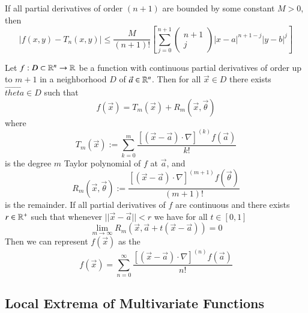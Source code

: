 \documentclass[12pt, a4paper, oneside, openright, titlepage]{book}
\begin{document}
\begin{appendices}
    \begin{rmk}
        If all partial derivatives of order $(n+1)$ are bounded by some constant $M > 0$, then \begin{equation}
            |f(x,y) - T_n(x,y)| \leq \frac{M}{(n+1)!}\left[\sum\limits_{j=0}^{n+1}\begin{pmatrix} n + 1 \\ j \end{pmatrix}|x-a|^{n+1-j}|y-b|^j\right]
        \end{equation}
    \end{rmk}
    
    
    \begin{namthm}
        Let $f:D\subset\mathbb R^n \rightarrow \mathbb R$ be a function with continuous partial derivatives of order up to $m+1$ in a neighborhood $D$ of $\vec{a} \in \mathbb R^n$. Then for all $\vec{x} \in D$ there exists $\vec{theta} \in D$ such that \begin{equation}
            f(\vec{x}) = T_m(\vec{x}) + R_m(\vec{x},\vec{\theta})
        \end{equation}
        where \begin{equation}
            T_m(\vec{x}) := \sum\limits_{k=0}^m\frac{\left[(\vec{x} - \vec{a})\cdot \nabla\right]^{(k)}f(\vec{a})}{k!}
        \end{equation}
        is the degree $m$ Taylor polynomial of $f$ at $\vec{a}$, and \begin{equation}
            R_m(\vec{x}, \vec{\theta}) := \frac{\left[(\vec{x} - \vec{a})\cdot \nabla\right]^{(m+1)}f(\vec{\theta})}{(m+1)!}
        \end{equation}
        is the remainder. If all partial derivatives of $f$ are continuous and there exists $r \in \mathbb R^{+}$ such that whenever $||\vec{x} - \vec{a}|| < r$ we have for all $t \in [0,1]$ \begin{equation}
            \lim_{m\rightarrow \infty} R_m(\vec{x}, \vec{a}+t(\vec{x} - \vec{a})) = 0
        \end{equation}
        Then we can represent $f(\vec{x})$ as the  \begin{equation}
            f(\vec{x}) = \sum\limits_{n = 0}^{\infty}\frac{\left[(\vec{x} - \vec{a})\cdot \nabla\right]^{(n)}f(\vec{a})}{n!}
        \end{equation}
    \end{namthm}
    
    \subsection{Local Extrema of Multivariate Functions}
    

\end{appendices}
\end{document}
